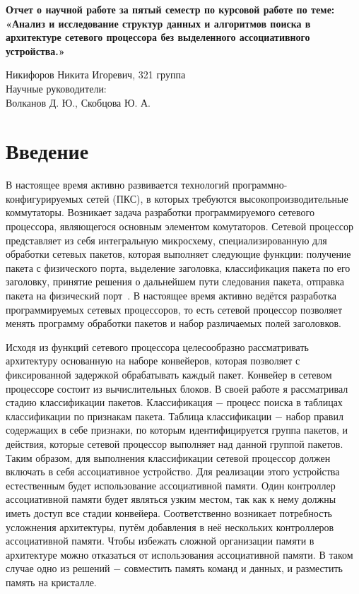 \documentclass[a4peper, 12pt, titlepage, finall]{extreport}
\begin{document}
\begin{center}
    {\large \bf Отчет о научной работе за пятый семестр по курсовой работе по теме:
    «Анализ и исследование структур данных и алгоритмов поиска в архитектуре сетевого процессора без выделенного ассоциативного устройства.»}

\end{center}
        \begin{flushright}
            {Никифоров Никита Игоревич, 321 группа}\\
            {Научные руководители:\\ Волканов Д. Ю., Скобцова Ю. А.}
        \end{flushright}
    \section{Введение}
        В настоящее время активно развивается технологий программно-конфигурируемых сетей (ПКС), в которых требуются высокопроизводительные 
        коммутаторы. Возникает задача разработки программируемого сетевого процессора, являющегося основным элементом комутаторов. Сетевой процессор 
        представляет из себя интегральную микросхему, специализированную для обработки сетевых пакетов, которая выполняет следующие функции:
        получение пакета с физического порта, выделение заголовка,
        классификация пакета по его заголовку, принятие решения о дальнейшем пути следования пакета, отправка пакета на физический порт~\cite{chao2007high:1}.
        В настоящее время активно ведётся разработка программируемых сетевых процессоров, то есть сетевой процессор позволяет менять
        программу обработки пакетов и набор различаемых полей заголовков.
        
        Исходя из функций сетевого процессора целесообразно рассматривать архитектуру основанную на
        наборе конвейеров, которая позволяет с фиксированной задержкой обрабатывать каждый пакет. 
        Конвейер в сетевом процессоре состоит из вычислительных блоков. В своей работе я рассматривал стадию классификации пакетов. Классификация $-$ процесс поиска в таблицах классификации
        по признакам пакета. Таблица классификации $-$ набор правил содержащих в себе признаки, по которым идентифицируется группа пакетов,
        и действия, которые сетевой процессор выполняет над данной группой пакетов. 
        Таким образом, для выполнения классификации сетевой процессор должен включать в себя ассоциативное устройство. Для реализации этого устройства естественным будет использование 
        ассоциативной памяти. Один контроллер ассоциативной памяти будет являться узким местом, так как к нему должны иметь доступ все стадии конвейера.
        Соответственно возникает потребность усложнения архитектуры, путём добавления в неё нескольких контроллеров ассоциативной памяти.
        Чтобы избежать сложной организации памяти в архитектуре можно отказаться от использования ассоциативной памяти. 
        В таком случае одно из решений $-$ совместить память команд и данных, и разместить память на кристалле.
\end{document}
